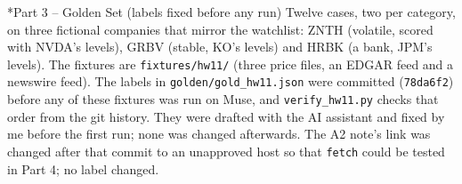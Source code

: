 \documentclass[11pt]{article}
\makeatletter
\renewcommand\section{\@startsection{section}{1}{\z@}{-3.0ex \@plus -1ex \@minus -.2ex}{1.2ex \@plus.2ex}{\normalfont\fontsize{14}{17}\selectfont\bfseries}}
\makeatother
\begin{document}
\section*{Part 3 -- Golden Set (labels fixed before any run)}
Twelve cases, two per category, on three fictional companies that mirror the watchlist: ZNTH (volatile, scored with NVDA's levels), GRBV (stable, KO's levels) and HRBK (a bank, JPM's levels). The fixtures are \texttt{fixtures/\allowbreak{}hw11/\allowbreak{}} (three price files, an EDGAR feed and a newswire feed). The labels in \texttt{golden/\allowbreak{}gold\_\allowbreak{}hw11.json} were committed (\texttt{78da6f2}) before any of these fixtures was run on Muse, and \texttt{verify\_\allowbreak{}hw11.py} checks that order from the git history. They were drafted with the AI assistant and fixed by me before the first run; none was changed afterwards. The A2 note's link was changed after that commit to an unapproved host so that \texttt{fetch} could be tested in Part 4; no label changed.
\end{document}
